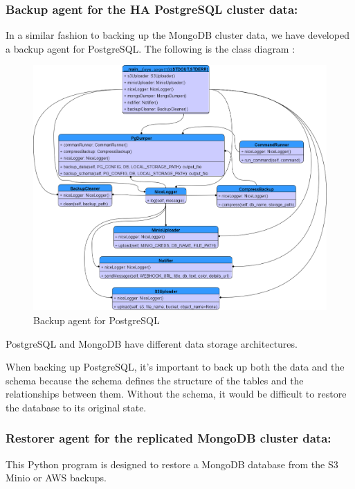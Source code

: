 \subsubsection{Backup agent for the HA PostgreSQL cluster data: }

In a similar fashion to backing up the MongoDB cluster data, we have developed a backup agent for PostgreSQL. The following is the class diagram : 

\begin{figure}[H]\centering
\includegraphics[width=1.0\textwidth,angle=00]{assets/f59.png}
\caption{Backup agent for PostgreSQL}
\label{fig:f59}
\end{figure}


PostgreSQL and MongoDB have different data storage architectures.  

When backing up PostgreSQL, it's important to back up both the data and the schema because the schema defines the structure of the tables and the relationships between them. Without the schema, it would be difficult to restore the database to its original state. 

\subsubsection{Restorer agent for the replicated MongoDB cluster data: }

This Python program is designed to restore a MongoDB database from the S3 Minio or AWS backups. 

